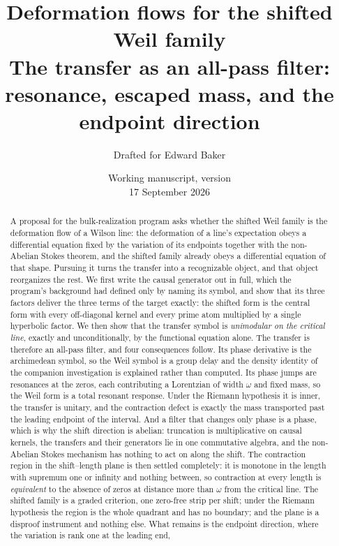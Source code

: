 \documentclass[11pt]{article}
\title{Deformation flows for the shifted Weil family\\[5pt]
\large The transfer as an all-pass filter: resonance, escaped mass,
and the endpoint direction}
\author{Drafted for Edward Baker}
\date{Working manuscript, version \draftversion\\17 September 2026}
\numberwithin{equation}{section}
\theoremstyle{definition}
\theoremstyle{remark}
\begin{document}
\maketitle
\begin{abstract}
A proposal for the bulk-realization program asks whether the shifted Weil family
is the deformation flow of a Wilson line: the deformation of a line's expectation
obeys a differential equation fixed by the variation of its endpoints together
with the non-Abelian Stokes theorem, and the shifted family already obeys a
differential equation of that shape. Pursuing it turns the transfer into a
recognizable object, and that object reorganizes the rest. We first write the
causal generator out in full, which the program's background had defined only by
naming its symbol, and show that its three factors deliver the three terms of the
target exactly: the shifted form is the central form with every off-diagonal
kernel and every prime atom multiplied by a single hyperbolic factor. We then
show that the transfer symbol is \emph{unimodular on the critical line}, exactly
and unconditionally, by the functional equation alone. The transfer is therefore
an all-pass filter, and four consequences follow. Its phase derivative is the
archimedean symbol, so the Weil symbol is a group delay and the density identity
of the companion investigation is explained rather than computed. Its phase jumps
are resonances at the zeros, each contributing a Lorentzian of width $\omega$ and
fixed mass, so the Weil form is a total resonant response. Under the Riemann
hypothesis it is inner, the transfer is unitary, and the contraction defect is
exactly the mass transported past the leading endpoint of the interval. And a
filter that changes only phase is a phase, which is why the shift direction is
abelian: truncation is multiplicative on causal kernels, the transfers and their
generators lie in one commutative algebra, and the non-Abelian Stokes mechanism
has nothing to act on along the shift. The contraction region in the
shift--length plane is then settled completely: it is monotone in the length with
supremum one or infinity and nothing between, so contraction at every length is
\emph{equivalent} to the absence of zeros at distance more than $\omega$ from the
critical line. The shifted family is a graded criterion, one zero-free strip per
shift; under the Riemann hypothesis the region is the whole quadrant and has no
boundary; and the plane is a disproof instrument and nothing else. What remains
is the endpoint direction, where the variation is rank one at the leading end,

\end{abstract}
\end{document}
